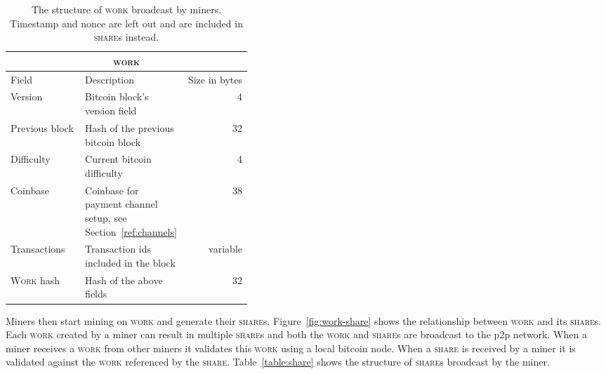 \documentclass{article}
\begin{document}
\begin{table}
  \centering
  \begin{tabular}{ lp{0.4\linewidth}r }
    \multicolumn{3}{c}{\textsc{work}} \\
    \hline
    Field & Description & Size in bytes \\
    \hline
    Version & Bitcoin block's version field & 4\\
    Previous block & Hash of the previous bitcoin block & 32 \\
    Difficulty & Current bitcoin difficulty & 4 \\
    Coinbase & Coinbase for payment channel setup, see Section~\ref{ref:channels} & 38 \\
    Transactions & Transaction ids included in the block & variable \\
    \textsc{Work} hash & Hash of the above fields & 32 \\
    \hline
  \end{tabular}
  \caption{The structure of \textsc{work} broadcast by
    miners. Timestamp and nonce are left out and are included in
    \textsc{share}s instead.}\label{table:work}
\end{table}

Miners then start mining on \textsc{work} and generate their
\textsc{share}s. Figure~\ref{fig:work-share} shows the relationship
between \textsc{work} and its \textsc{share}s. Each \textsc{work}
created by a miner can result in multiple \textsc{share}s and both the
\textsc{work} and \textsc{share}s are broadcast to the p2p
network. When a miner receives a \textsc{work} from other miners it
validates this \textsc{work} using a local bitcoin node. When a
\textsc{share} is received by a miner it is validated against the
\textsc{work} referenced by the
\textsc{share}. Table~\ref{table:share} shows the structure of
\textsc{share}s broadcast by the miner.
\end{document}
